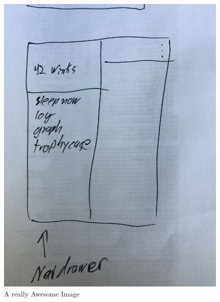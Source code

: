 \documentclass[twoside, letterpaper, american]{article}
\begin{document}
\begin{figure}[!htb]
  \includegraphics[width=\linewidth]{images/drawer.JPG}
  \caption{A really Awesome Image}\label{fig:drawer}
\endminipage\hfill
{}

\end{figure}
\end{document}
